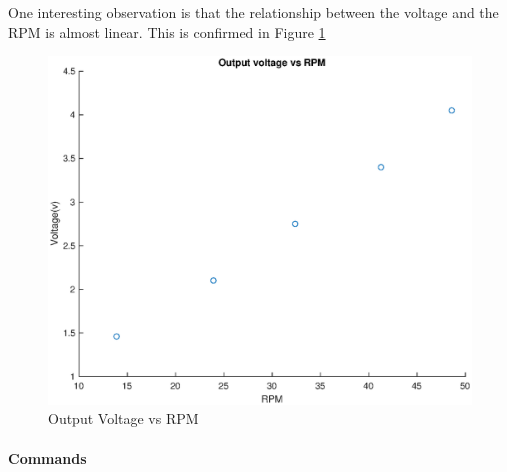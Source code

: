 \documentclass[a4paper]{article}
\begin{document}



One interesting observation is that the relationship between the voltage and the 
RPM is almost linear. This is confirmed in Figure \ref{graph: Output Voltage vs RPM}



 \begin{figure}[H]
    \centering
      \includegraphics[scale=0.4]{./media/voltagevsrpm.eps}
   \caption{Output Voltage vs RPM}
   \label{graph: Output Voltage vs RPM}
\end{figure}




\paragraph*{Commands}
\end{document}
